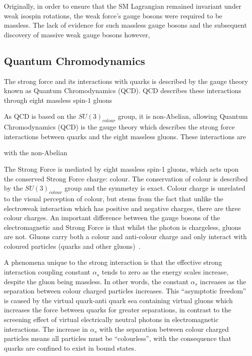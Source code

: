 
Originally, in order to ensure that the SM Lagrangian remained invariant under weak isospin rotations, the weak force's gauge bosons were required to be massless.
The lack of evidence for such massless gauge bosons and the subsequent discovery of massive weak gauge bosons however, 

\subsection{Quantum Chromodynamics}\label{subsec:QED}
The strong force and its interactions with quarks is described by the gauge theory known as Quantum Chromodynamics (QCD).
QCD describes these interactions through eight massless spin-$1$ gluons 


As QCD is based on the $SU(3)_{colour}$ group, it is non-Abelian, allowing
Quantum Chromodynamics (QCD) is the gauge theory which describes the strong force interactions between quarks and the eight massless gluons.
These interactions are 

 with the non-Abelian 

The Strong Force is mediated by eight massless spin-1 gluons, which acts upon the conserved Strong Force charge: colour\cite{ElectroweakStrong}. 
The conservation of colour is described by the $SU(3)_{colour}$ group and the symmetry is exact. 
Colour charge is unrelated to the visual perception of colour, but stems from the fact that unlike the electroweak interaction which has positive and negative charges, there are three colour charges. 
An important difference between the gauge bosons of the electromagnetic and Strong Force is that whilst the photon is chargeless, gluons are not. 
Gluons carry both a colour and anti-colour charge and only interact with coloured particles (quarks and other gluons)~\cite{ElectroweakStrong}. 


A phenomena unique to the strong interaction is that the effective strong interaction coupling constant $\alpha_{s}$ tends to zero as the energy scales increase, despite the gluon being massless. 
In other words, the constant $\alpha_{s}$ increases as the separation between colour charged particles increases. 
This ``asymptotic freedom'' is caused by the virtual quark-anti quark sea containing virtual gluons which increases the force between quarks for greater separations, in contrast to the screening effect of virtual electrically neutral photons in electromagnetic interactions. 
The increase in $\alpha_{s}$ with the separation between colour charged particles means all particles must be ``colourless'', with the consequence that quarks are confined to exist in bound states\cite{ElectroweakStrong}. 




